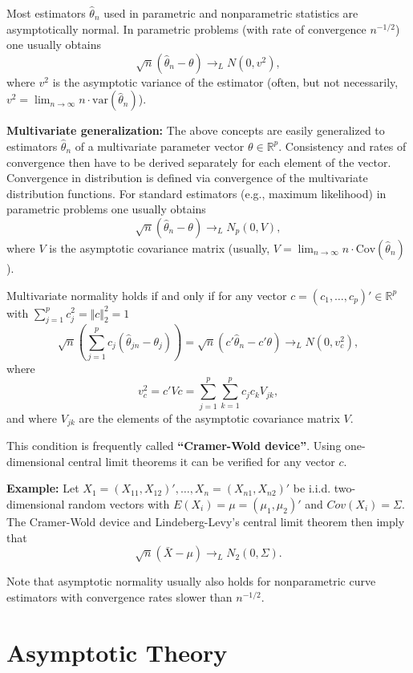 \documentclass[
]{book}
\begin{document}
Most estimators \(\hat\theta_n\) used in parametric and nonparametric statistics are asymptotically normal. In parametric problems (with rate of convergence \(n^{-1/2}\)) one usually obtains
\[\sqrt{n}(\hat\theta_n -\theta )\to_L N(0,v^2),\]
where \(v^2\) is the asymptotic variance of the estimator (often, but not necessarily, \(v^2=\lim_{n\to\infty} n\cdot\textrm{var}(\hat\theta_n)\)).

\hfill\break

\textbf{Multivariate generalization:} The above concepts are easily generalized to estimators \(\hat\theta_n\) of a multivariate parameter vector \(\theta\in\mathbb{R}^p\). Consistency and rates of convergence then have to be derived separately for each element of the vector. Convergence in distribution is defined via convergence of the multivariate distribution functions. For standard estimators (e.g., maximum likelihood) in parametric problems one usually obtains
\[\sqrt{n}(\hat\theta_n -\theta )\to_L N_p(0,V),\]
where \(V\) is the asymptotic covariance matrix (usually, \(V=\lim_{n\to\infty} n\cdot\textrm{Cov}(\hat\theta_n)\)).

\hfill\break

Multivariate normality holds if and only if for any vector \(c=(c_1,\dots,c_p)'\in\mathbb{R}^p\) with \(\sum_{j=1}^p c_j^2=\Vert c\Vert_2^2=1\)
\[\sqrt{n}\left(\sum_{j=1}^p c_j (\hat\theta_{jn} -\theta_j)\right)=\sqrt{n}\left(c'\hat\theta_n-c'\theta\right)\to_L N\left(0,v_c^2\right),\]
where
\[v_c^2=c'Vc=\sum_{j=1}^p\sum_{k=1}^p c_jc_k V_{jk},\]
and where \(V_{jk}\) are the elements of the asymptotic covariance matrix \(V\).

This condition is frequently called \textbf{``Cramer-Wold device''}. Using one-dimensional central limit theorems it can be verified for any vector \(c\).

\hfill\break

\textbf{Example:} Let \(X_1=(X_{11},X_{12})',\dots,X_n=(X_{n1},X_{n2})'\) be i.i.d. two-dimensional random vectors with \(E(X_i)=\mu=(\mu_1,\mu_2)'\) and \(Cov(X_i)=\Sigma\). The Cramer-Wold device and Lindeberg-Levy's central limit theorem then imply that
\[\sqrt{n}\left(\bar X -\mu\right)\to_L N_2\left(0,\Sigma\right).\]

\hfill\break

Note that asymptotic normality usually also holds for nonparametric curve estimators with convergence rates slower than \(n^{-1/2}\).

\hypertarget{asymptotic-theory}{%
\section{Asymptotic Theory}\label{asymptotic-theory}}
\end{document}
